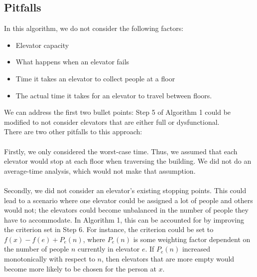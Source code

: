 \documentclass[letterpaper]{article} %
\begin{document}
\subsection{Pitfalls}
In this algorithm, we do not consider the following factors:
\begin{itemize}
	\item Elevator capacity
	\item What happens when an elevator fails
	\item Time it takes an elevator to collect people at a floor
	\item The actual time it takes for an elevator to travel between floors.
\end{itemize}
We can address the first two bullet points: Step 5 of Algorithm 1 could be modified to not consider elevators that are either full or dysfunctional. \\
There are two other pitfalls to this approach:\\\\
Firstly, we only considered the worst-case time. Thus, we assumed that each elevator would stop at each floor when traversing the building. We did not do an average-time analysis, which would not make that assumption. \\\\
Secondly, we did not consider an elevator's existing stopping points. This could lead to a scenario where one elevator could be assigned a lot of people and others would not; the elevators could become unbalanced in the number of people they have to accommodate. In Algorithm 1, this can be accounted for by improving the criterion set in Step 6. For instance, the criterion could be set to $f(x) - f(e) + P_{e}(n)$, where $P_{e}(n)$ is some weighting factor dependent on the number of people $n$ currently in elevator $e$. If $P_{e}(n)$ increased monotonically with respect to $n$, then elevators that are more empty would become more likely to be chosen for the person at $x$. 
\end{document}
